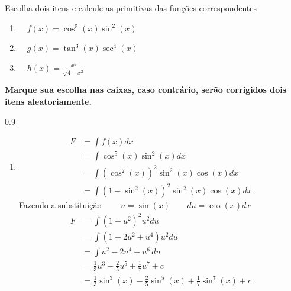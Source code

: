 \documentclass[a4paper,12pt,fleqn]{article}
\newenvironment{resposta}%
{\begingroup\color{blue}\small\begin{spacing}{0.9}}%
  {\end{spacing}\endgroup}
\begin{document}
\vspace{\baselineskip}
Escolha dois itens e calcule as primitivas das funções correspondentes
\begin{enumerate}[label=\alph*) \raisebox{-2mm}{\huge\(\square\)}]
  \setlength\itemsep{1em}
  \item \(\quad f(x) = \cos^5(x)\sin^2(x) \)
  \item \(\quad g(x) = \tan^3(x)\sec^4(x) \)
  \item \(\quad h(x) = \frac{x^5}{\sqrt{4-x^2}}  \)
\end{enumerate}
\textbf{Marque sua escolha nas caixas,
caso contrário, serão corrigidos dois itens aleatoriamente.}

\begin{resposta}
  \begin{enumerate}[label=\alph*)]

    \item
    \begin{align*}
      F
      & = \int f(x) dx \\
      & = \int \cos^5(x)\sin^2(x) dx \\
      & = \int \left(\cos^2(x)\right)^2\sin^2(x)\cos(x) dx \\
      & = \int \left(1-\sin^2(x)\right)^2\sin^2(x)\cos(x) dx
    \end{align*}
    Fazendo a substituição
    \(
      \qquad
      u = \sin(x)
      \qquad
      du = \cos(x)dx
    \)
    \begin{align*}
      F
      & = \int \left(1-u^2\right)^2 u^2 du \\
      & = \int \left(1-2u^2+u^4\right) u^2 du \\
      & = \int u^2-2u^4+u^6 \, du \\
      & = \frac{1}{3} u^3
        - \frac{2}{5} u^5
        + \frac{1}{7} u^7
        + c \\
      & = \frac{1}{3} \sin^3(x)
        - \frac{2}{5} \sin^5(x)
        + \frac{1}{7} \sin^7(x)
        + c
    \end{align*}


\end{enumerate}
\end{resposta}
\end{document}
